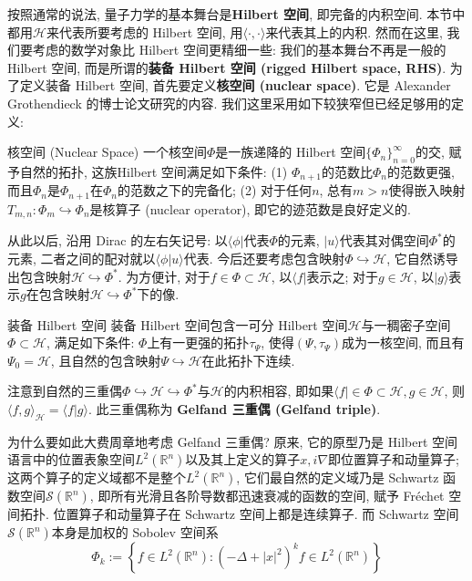 
     按照通常的说法, 量子力学的基本舞台是\textbf{Hilbert 空间}, 即完备的内积空间. 本节中都用$\mathcal{H}$来代表所要考虑的 Hilbert 空间, 用$\langle\cdot,\cdot\rangle$来代表其上的内积. 然而在这里, 我们要考虑的数学对象比 Hilbert 空间更精细一些: 我们的基本舞台不再是一般的 Hilbert 空间, 而是所谓的\textbf{装备 Hilbert 空间 (rigged Hilbert space, RHS)}. 为了定义装备 Hilbert 空间, 首先要定义\textbf{核空间 (nuclear space)}. 它是 Alexander Grothendieck 的博士论文研究的内容. 我们这里采用如下较狭窄但已经足够用的定义:

\begin{definition}{核空间 (Nuclear Space)}
一个核空间$\Phi$是一族递降的 Hilbert 空间$\{\Phi_n\}_{n=0}^\infty$的交, 赋予自然的拓扑, 这族Hilbert 空间满足如下条件: (1) $\Phi_{n+1}$的范数比$\Phi_n$的范数更强, 而且$\Phi_n$是$\Phi_{n+1}$在$\Phi_n$的范数之下的完备化; (2) 对于任何$n$, 总有$m>n$使得嵌入映射$T_{m,n}:\Phi_{m}\hookrightarrow \Phi_n$是核算子 (nuclear operator), 即它的迹范数是良好定义的.
\end{definition}

      从此以后, 沿用 Dirac 的左右矢记号: 以$\langle\phi|$代表$\Phi$的元素, $|u\rangle$代表其对偶空间$\Phi^*$的元素, 二者之间的配对就以$\langle\phi|u\rangle$代表. 今后还要考虑包含映射$\Phi\hookrightarrow\mathcal{H}$, 它自然诱导出包含映射$\mathcal{H}\hookrightarrow\Phi^*$. 为方便计, 对于$f\in\Phi\subset\mathcal{H}$, 以$\langle f|$表示之; 对于$g\in\mathcal{H}$, 以$|g\rangle$表示$g$在包含映射$\mathcal{H}\hookrightarrow\Phi^*$下的像.

\begin{definition}{装备 Hilbert 空间}
装备 Hilbert 空间包含一可分 Hilbert 空间$\mathcal{H}$与一稠密子空间$\Phi\subset\mathcal{H}$, 满足如下条件: $\Phi$上有一更强的拓扑$\tau_\Psi$, 使得$(\Psi,\tau_\Psi)$成为一核空间, 而且有$\Psi_0=\mathcal{H}$, 且自然的包含映射$\Psi\hookrightarrow\mathcal{H}$在此拓扑下连续.
\end{definition}

    注意到自然的三重偶$\Phi\hookrightarrow\mathcal{H}\hookrightarrow\Phi^*$与$\mathcal{H}$的内积相容, 即如果$\langle f|\in\Phi\subset\mathcal{H},g\in\mathcal{H}$, 则$\langle f,g\rangle_{\mathcal{H}}=\langle f|g\rangle$. 此三重偶称为 \textbf{Gelfand 三重偶 (Gelfand triple)}.

    为什么要如此大费周章地考虑 Gelfand 三重偶? 原来, 它的原型乃是 Hilbert 空间语言中的位置表象空间$L^2(\mathbb{R}^n)$以及其上定义的算子$x,i\nabla$即位置算子和动量算子; 这两个算子的定义域都不是整个$L^2(\mathbb{R}^n)$, 它们最自然的定义域乃是 Schwartz 函数空间$\mathcal{S}(\mathbb{R}^n)$, 即所有光滑且各阶导数都迅速衰减的函数的空间, 赋予 Fréchet 空间拓扑. 位置算子和动量算子在 Schwartz 空间上都是连续算子. 而 Schwartz 空间$\mathcal{S}(\mathbb{R}^n)$本身是加权的 Sobolev 空间系
$$\Phi_k := \left\{f \in L^2 (\mathbb{R}^n): (-\Delta + |x|^ 2)^{k} f \in L^2 (\mathbb{R}^n) \right\}$$

